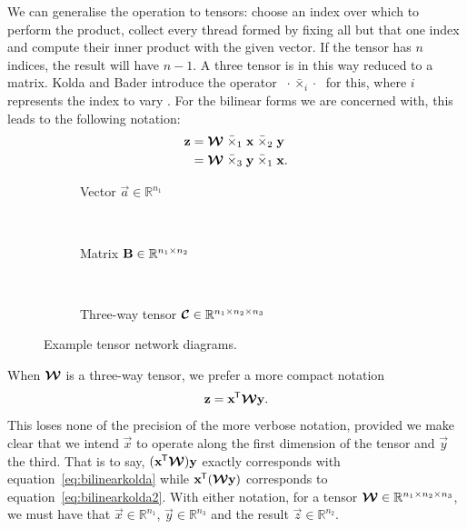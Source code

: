 We can generalise the operation to tensors: choose an index over which to perform the product,
collect every thread formed by fixing all but that one index and compute their inner product with the
given vector. If the tensor has \(n\) indices, the result will have \(n-1\). A three tensor is in
this way reduced to a matrix. Kolda and Bader introduce the operator
 \(\;\cdot \bar{\times}_i \cdot\;\)
for this, where \(i\) represents the index to vary \autocite{Kolda2009}. For the bilinear forms
we are concerned with, this leads to the following notation:
\begin{align}
	\mathbf{z} &= \bm{\mathcal{W}} \;\bar{\times}_1\; \mathbf{x}\; \bar{\times}_2\; \mathbf{y} 
	\label{eq:bilinearkolda} \\
	&= \bm{\mathcal{W}} \; \bar{\times}_3\; \mathbf{y}\; \bar{\times}_1\; \mathbf{x}.
	\label{eq:bilinearkolda2}
\end{align}

\begin{figure}
	\centering
	\begin{subfigure}[t]{0.45\textwidth}
	\centering
	\caption{Vector \(\vec{a}\in\mathbb{R}^{n_1}\)}\label{fig:tnd:vec}
	\end{subfigure} ~
	\begin{subfigure}[t]{0.45\textwidth}
	\centering
	\caption{Matrix \(\mathbf{B}\in\mathbb{R}^{n_1 \times n_2}\)}\label{fig:tnd:mat}
	\end{subfigure} \\
	
	\begin{subfigure}[t]{0.5\textwidth}
	\centering
	\caption{Three-way tensor 
		\(\bm{\mathcal{C}}\in\mathbb{R}^{n_1\times n_2\times n_3}\)}\label{fig:tnd:3ten}
	\end{subfigure}
	\caption{Example tensor network diagrams.}
	\label{fig:tnegs}
\end{figure}

When \(\bm{\mathcal{W}}\) is a three-way tensor, we prefer a more compact notation
\begin{equation}\label{eq:bilintensor}
	\mathbf{z} = \mathbf{x}^{\mkern-1.5mu\mathsf{T}}\bm{\mathcal{W}}\mathbf{y}.
\end{equation} This loses none of the precision of the more verbose notation, provided we make clear
that we intend \(\vec{x}\) to operate along the first dimension of the tensor and \(\vec{y}\) the
third. That is to say, \((\mathbf{x}^{\mkern-1.5mu\mathsf{T}}\bm{\mathcal{W}})\mathbf{y}\) exactly corresponds with 
equation~\eqref{eq:bilinearkolda} while \(\mathbf{x}^{\mkern-1.5mu\mathsf{T}}(\bm{\mathcal{W}}\mathbf{y})\) corresponds to
equation~\eqref{eq:bilinearkolda2}. With either notation, for a tensor 
\(\bm{\mathcal{W}} \in \mathbb{R}^{n_1 \times n_2 \times n_3}\), we must have that 
\(\vec{x}\in \mathbb{R}^{n_1}\), \(\vec{y} \in \mathbb{R}^{n_3}\) and the result 
\(\vec{z}\in\mathbb{R}^{n_2}\).

